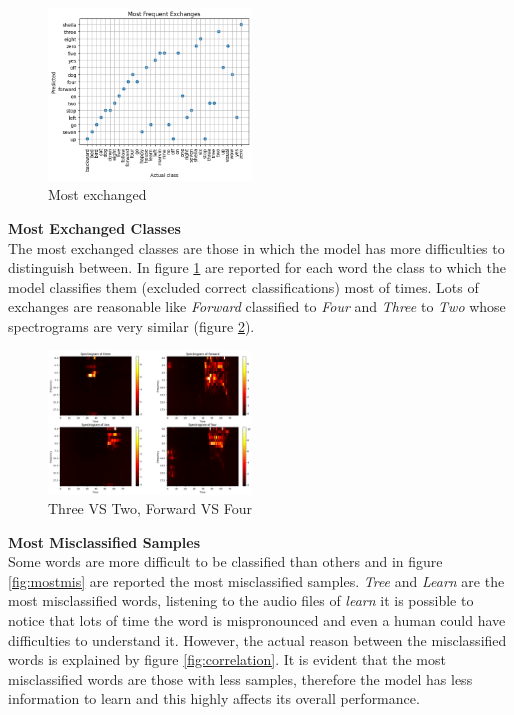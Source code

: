 \documentclass{article}
\begin{document}
\begin{multicols}{2}
    \begin{figure}[H]
        \centering
        \includegraphics[width=0.48\textwidth]{mostex.png}
        \caption{\small Most exchanged}
        \label{fig:mostex}
    \end{figure}

\noindent
\textbf{Most Exchanged Classes}\\
The most exchanged classes are those in which the model has more difficulties to distinguish between. In figure \ref{fig:mostex} are reported for each word the class to which
the model classifies them (excluded correct classifications) most of times. Lots of exchanges are reasonable like \textit{Forward} classified to \textit{Four} and
\textit{Three} to \textit{Two} whose spectrograms are very similar (figure \ref{fig:mostmis_ex}).

    \begin{figure}[H]
        \centering
        \includegraphics[width=0.48\textwidth]{mostmis_spec.png}
        \caption{\small Three VS Two, Forward VS Four}
        \label{fig:mostmis_ex}
    \end{figure}

\noindent
\textbf{Most Misclassified Samples}\\
Some words are more difficult to be classified than others and in figure \ref{fig:mostmis} are reported the most misclassified samples. \textit{Tree} and \textit{Learn} are the most misclassified words, listening to 
the audio files of \textit{learn} it is possible to notice that lots of time the word is mispronounced and even a human could have difficulties to understand it. However, the actual reason
between the misclassified words is explained by figure \ref{fig:correlation}. It is evident that the most misclassified words are those with less samples, therefore the model has less information to learn
and this highly affects its overall performance.


\end{multicols}
\end{document}
